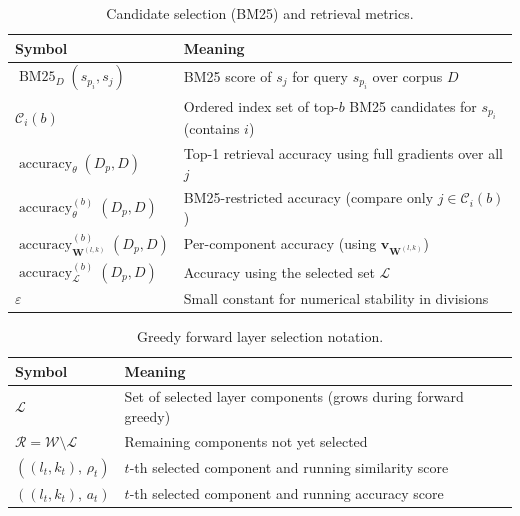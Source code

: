 \begin{table}[H]
    \centering
    \small
    \begin{tabular}{ll}
        \textbf{Symbol} & \textbf{Meaning} \\
        \hline
        $\operatorname{BM25}_D(s_{p_i}, s_j)$ & BM25 score of $s_j$ for query $s_{p_i}$ over corpus $D$ \\
        $\mathcal{C}_i(b)$ & Ordered index set of top-$b$ BM25 candidates for $s_{p_i}$ (contains $i$) \\
        $\operatorname{accuracy}_{\theta}(D_p,D)$ & Top-1 retrieval accuracy using full gradients over all $j$ \\
        $\operatorname{accuracy}^{(b)}_{\theta}(D_p,D)$ & BM25-restricted accuracy (compare only $j\in\mathcal{C}_i(b)$) \\
        $\operatorname{accuracy}^{(b)}_{\mathbf{W}^{(l,k)}}(D_p,D)$ & Per-component accuracy (using $\mathbf{v}_{\mathbf{W}^{(l,k)}}$) \\
        $\operatorname{accuracy}^{(b)}_{\mathcal{L}}(D_p,D)$ & Accuracy using the selected set $\mathcal{L}$ \\
        $\varepsilon$ & Small constant for numerical stability in divisions \\
    \end{tabular}
    \caption{Candidate selection (BM25) and retrieval metrics.}
    \label{tab:nomenclature-bm25-metrics}
\end{table}

\begin{table}[H]
    \centering
    \small
    \begin{tabular}{ll}
        \textbf{Symbol} & \textbf{Meaning} \\
        \hline
        $\mathcal{L}$ & Set of selected layer components (grows during forward greedy) \\
        $\mathcal{R}=\mathcal{W}\setminus\mathcal{L}$ & Remaining components not yet selected \\
        $((l_t,k_t),\,\rho_t)$ & $t$-th selected component and running similarity score \\
        $((l_t,k_t),\,a_t)$ & $t$-th selected component and running accuracy score \\
    \end{tabular}
    \caption{Greedy forward layer selection notation.}
    \label{tab:nomenclature-greedy}
\end{table}

